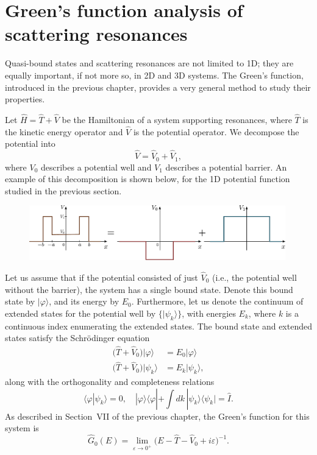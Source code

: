\documentclass[pra,12pt]{revtex4}
\begin{document}
\section{Green's function analysis of scattering resonances}

Quasi-bound states and scattering resonances are not limited to 1D;
they are equally important, if not more so, in 2D and 3D systems.  The
Green's function, introduced in the previous chapter, provides a very
general method to study their properties.

Let $\hat{H} = \hat{T} + \hat{V}$ be the Hamiltonian of a system
supporting resonances, where $\hat{T}$ is the kinetic energy operator
and $\hat{V}$ is the potential operator.  We decompose the potential
into
$$\hat{V} = \hat{V}_0 + \hat{V}_1,$$
where $V_0$ describes a potential well and $V_1$ describes a potential
barrier.  An example of this decomposition is shown below, for the
1D potential function studied in the previous section.

\begin{figure}[h]
  \centering\includegraphics[width=0.99\textwidth]{resonancewell_decomp}
\end{figure}

Let us assume that if the potential consisted of just $\hat{V}_0$
(i.e., the potential well without the barrier), the system has a
single bound state.  Denote this bound state by $|\varphi\rangle$, and
its energy by $E_0$.  Furthermore, let us denote the continuum of
extended states for the potential well by $\{|\psi_k\rangle\}$, with
energies $E_k$, where $k$ is a continuous index enumerating the
extended states.  The bound state and extended states satisfy the
Schr\"odinger equation
$$\begin{aligned}\big(\hat{T} + \hat{V}_0\big) |\varphi\rangle &= E_0 |\varphi\rangle \\ \big(\hat{T} + \hat{V}_0\big) |\psi_k\rangle &= E_k |\psi_k\rangle,
\end{aligned}$$
along with the orthogonality and completeness relations
$$\langle\varphi|\psi_k\rangle = 0, \quad |\varphi\rangle\langle\varphi| + \int dk\, |\psi_k\rangle\langle\psi_k| = \hat{I}.$$
As described in Section~VII of the previous chapter, the Green's
function for this system is
$$\hat{G}_0(E) = \lim_{\varepsilon\rightarrow0^+} \Big(E - \hat{T} - \hat{V}_0 + i\varepsilon\Big)^{-1}.$$
\end{document}
